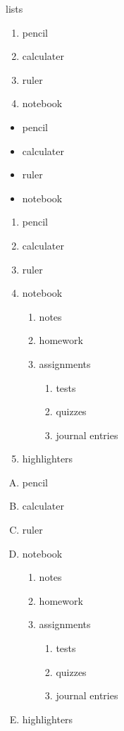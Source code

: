 \documentclass[11pt]{article}
\begin{document}
lists

\begin{enumerate}
\item pencil
\item calculater
\item ruler
\item notebook
\end{enumerate}

\begin{itemize}
\item pencil
\item calculater
\item ruler
\item notebook
\end{itemize}

\begin{enumerate}
\item pencil
\item calculater
\item ruler
\item notebook
	\begin{enumerate}
	\item notes
	\item homework
	\item assignments
		\begin{enumerate}
		\item tests
		\item quizzes
		\item journal entries
	
		\end{enumerate}
	\end{enumerate}
\item highlighters
\end{enumerate}

\vspace{1cm}

\begin{enumerate}[A.]
\item pencil
\item calculater
\item ruler
\item notebook
	\begin{enumerate}
	\item notes
	\item homework
	\item assignments
		\begin{enumerate}
		\item tests
		\item quizzes
		\item journal entries
	
		\end{enumerate}
	\end{enumerate}
\item highlighters
\end{enumerate}
\end{document}
